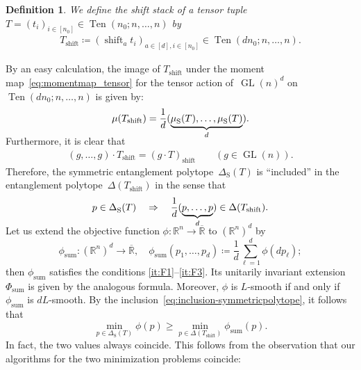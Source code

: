 \documentclass[11pt,letterpaper]{article}
\newtheorem{definition}[theorem]{Definition}\AddToHook{env/definition/begin}{\crefalias{theorem}{definition}}
\numberwithin{equation}{section}
\newcommand{\RR}{\mathbb{R}}
\DeclareMathOperator{\GL}{GL}
\DeclareMathOperator{\Sym}{S}
\DeclareMathOperator{\Ten}{Ten}
\DeclareMathOperator{\Shf}{shift}
\DeclareMathOperator{\Sum}{sum}
\begin{document}
\begin{definition}\label{def:shift_stack}
We define the \emph{shift stack} of a tensor tuple~$T = (t_i)_{i\in[n_0]} \in \Ten(n_0; n,\dots,n)$ by
\begin{align*}
    T_{\Shf} \coloneqq (\Shf_a t_i)_{a\in[d], i \in [n_0]} \in \Ten(dn_0; n,\dots,n).
\end{align*}
\end{definition}


By an easy calculation, the image of $T_{\Shf}$ under the moment map~\eqref{eq:momentmap_tensor} for the tensor action of~$\GL(n)^d$ on $\Ten(dn_0; n,\dots,n)$ is given by:
\begin{equation}\label{eq:mu_rot}
    \mu(T_{\Shf}) = \frac1d(\smash{\underbrace{\mu_{\Sym}(T), \ldots, \mu_{\Sym}(T)}_d}).
\end{equation}
Furthermore, it is clear that
\begin{align}\label{eq:shift equivariance}
    (g,\ldots,g) \cdot T_{\Shf} = (g\cdot T)_{\Shf} \qquad (g \in \GL(n)).
\end{align}
Therefore, the symmetric entanglement polytope~$\Delta_{\Sym}(T)$ is ``included'' in the entanglement polytope~$\Delta(T_{\Shf})$ in the sense that
\begin{align}\label{eq:inclusion-symmetricpolytope}
    p \in \Delta_{\Sym}(T)
    \quad\Rightarrow\quad
    \frac1d(\smash{\underbrace{p,\dots,p}_d}) \in \Delta(T_{\Shf}).
\end{align}
Let us extend the objective function $\phi \colon \RR^n \to \overline{\RR}$ to $(\RR^n)^d$ by
\begin{equation}\label{eq:phisum}
    \phi_{\Sum} \colon (\RR^n)^d \to \overline{\RR},\quad\phi_{\Sum}(p_1, \ldots, p_d) \coloneqq \frac1d\sum_{\ell=1}^d \phi(dp_\ell);
\end{equation}
then $\phi_{\Sum}$ satisfies the conditions \ref{it:F1}--\ref{it:F3}.
Its unitarily invariant extension~$\Phi_{\Sum}$ is given by the analogous formula.
Moreover, $\phi$ is $L$-smooth if and only if $\phi_{\Sum}$ is $dL$-smooth.
By the inclusion~\eqref{eq:inclusion-symmetricpolytope}, it follows that
\[ \min_{p \in \Delta_{\Sym}(T)}\phi(p) \ge \min_{p \in \Delta(T_{\Shf})}\phi_{\Sum}(p). \]
In fact, the two values always coincide.
This follows from the observation that our algorithms for the two minimization problems coincide:
\end{document}
